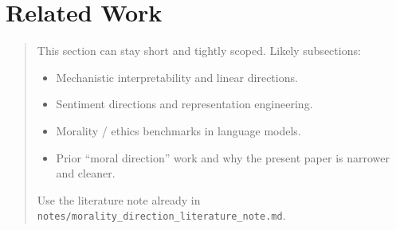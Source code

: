 \documentclass[11pt]{article}
\newcommand{\draftnote}[1]{%
  \begin{quote}\footnotesize\color{gray}#1\end{quote}%
}
\begin{document}
\section{Related Work}
\draftnote{
This section can stay short and tightly scoped. Likely subsections:
\begin{itemize}[leftmargin=1.5em]
    \item Mechanistic interpretability and linear directions.
    \item Sentiment directions and representation engineering.
    \item Morality / ethics benchmarks in language models.
    \item Prior ``moral direction'' work and why the present paper is narrower and cleaner.
\end{itemize}
Use the literature note already in \texttt{notes/morality\_direction\_literature\_note.md}.
}
\end{document}
